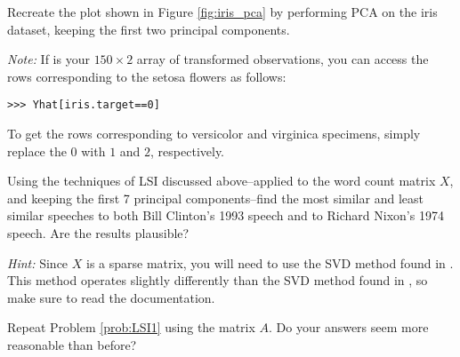 
Recreate the plot shown in Figure \ref{fig:iris_pca} by performing PCA on the iris dataset, keeping the first two principal components.

\emph{Note:}
If  is your $150 \times 2$ array of transformed observations, you can access the rows corresponding to the setosa flowers as follows:
\begin{lstlisting}
>>> Yhat[iris.target==0]
\end{lstlisting}
To get the rows corresponding to versicolor and virginica specimens, simply replace the $0$ with $1$ and $2$, respectively.

Using the techniques of LSI discussed above--applied to the word count matrix $X$, and keeping the first 7 principal components--find the most similar and least similar speeches to both Bill Clinton's 1993 speech and to Richard Nixon's 1974 speech.
Are the results plausible?

\emph{Hint:} Since $X$ is a sparse matrix, you will need to use the SVD method found in .
This method operates slightly differently than the SVD method found in , so make sure to read the
documentation.
\label{prob:LSI1}

Repeat Problem \ref{prob:LSI1} using the matrix $A$. Do your answers seem more reasonable than before?
